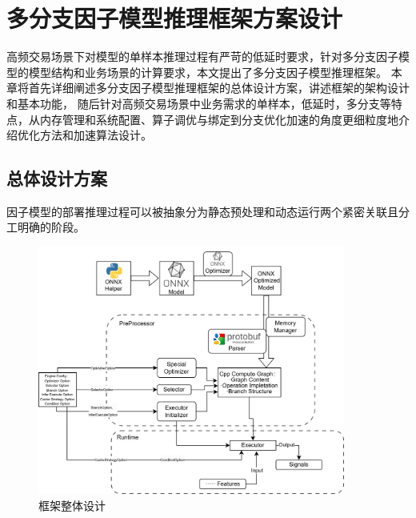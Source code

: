 \chapter{多分支因子模型推理框架方案设计}

高频交易场景下对模型的单样本推理过程有严苛的低延时要求，针对多分支因子模型的模型结构和业务场景的计算要求，本文提出了多分支因子模型推理框架。
本章将首先详细阐述多分支因子模型推理框架的总体设计方案，讲述框架的架构设计和基本功能，
随后针对高频交易场景中业务需求的单样本，低延时，多分支等特点，从内存管理和系统配置、算子调优与绑定到分支优化加速的角度更细粒度地介绍优化方法和加速算法设计。
\section{总体设计方案}

因子模型的部署推理过程可以被抽象分为静态预处理和动态运行两个紧密关联且分工明确的阶段。
\begin{figure}[h]
    \centering
    \includegraphics[width=0.9\textwidth]{image/chap03/framework.jpg}
    \caption{框架整体设计}
    \label{fig:hole}
\end{figure}

